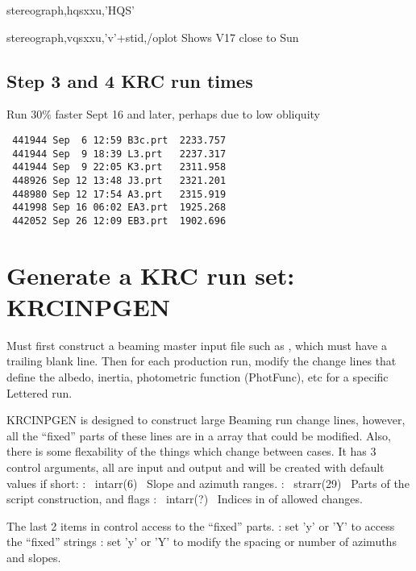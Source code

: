 \documentclass{article}
\begin{document}
stereograph,hqsxxu,'HQS' 

stereograph,vqsxxu,'v'+stid,/oplot  Shows V17 close to Sun

\subsection{Step 3 and 4 KRC run times}
Run 30\% faster Sept 16 and later, perhaps due to low obliquity
\begin{verbatim}
 441944 Sep  6 12:59 B3c.prt  2233.757
 441944 Sep  9 18:39 L3.prt   2237.317 
 441944 Sep  9 22:05 K3.prt   2311.958
 448926 Sep 12 13:48 J3.prt   2321.201
 448980 Sep 12 17:54 A3.prt   2315.919
 441998 Sep 16 06:02 EA3.prt  1925.268
 442052 Sep 26 12:09 EB3.prt  1902.696
\end{verbatim}  


\appendix %


\section{Generate a KRC run set: KRCINPGEN}

Must first construct a beaming master input file such as , which must
have a trailing blank line. Then for each production run, modify the change
lines that define the albedo, inertia, photometric function (PhotFunc), etc for
a specific Lettered run.

KRCINPGEN is designed to construct large Beaming run change lines, however, all
the ``fixed'' parts of these lines are in a array that could be modified. Also,
there is some flexability of the things which change between cases. It has 3
control arguments, all are input and output and will be created with default
values if short:
:  \ intarr(6) \ Slope and azimuth ranges. 
:  \  strarr(29) \ Parts of the script construction, and flags
:  \    intarr(?) \  Indices in  of allowed changes.

The last 2 items in  control access to the ``fixed'' parts.
\qi [last-1]: set 'y' or 'Y' to access the ``fixed'' strings 
\qi [last]: set 'y' or 'Y' to modify the spacing or number of azimuths and slopes.
\end{document}
